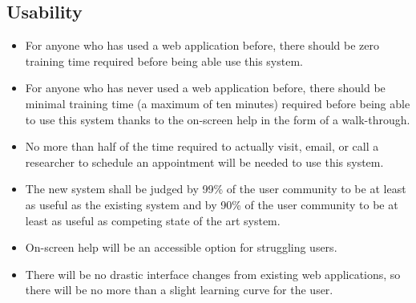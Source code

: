 \subsection{Usability}
\begin{itemize}
\item For anyone who has used a web application before, there should be zero training time required before being able use this system.
\item For anyone who has never used a web application before, there should be minimal training time (a maximum of ten minutes) required before being able to use this system thanks to the on-screen help in the form of a walk-through.
\item No more than half of the time required to actually visit, email, or call a researcher to schedule an appointment will be needed to use this system.
\item The new system shall be judged by 99\% of the user community to be at least as useful as the existing system and by 90\% of the user community to be at least as useful as competing state of the art system.
\item On-screen help will be an accessible option for struggling users.
\item There will be no drastic interface changes from existing web applications, so there will be no more than a slight learning curve for the user.
\end{itemize}
